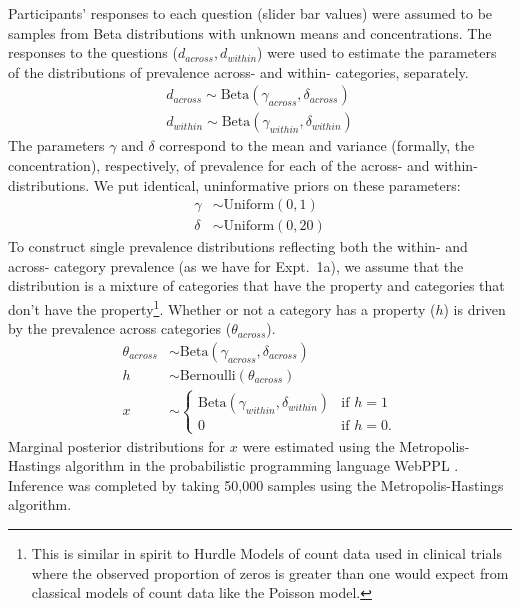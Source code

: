 \documentclass[10pt,letterpaper]{article}
\begin{document}
Participants' responses to each question (slider bar values) were assumed to be samples from Beta distributions with unknown means and concentrations. 
The responses to the questions ($d_{across}, d_{within}$) were used to estimate the parameters of the distributions of prevalence across- and within- categories, separately. 
\begin{align*}
d_{across} \sim \text{Beta}(\gamma_{across}, \delta_{across}) \\
d_{within} \sim \text{Beta}(\gamma_{within}, \delta_{within}) 
\end{align*}
The parameters $\gamma$ and $\delta$ correspond to the mean and variance (formally, the concentration), respectively, of prevalence for each of the across- and within- distributions.
We put identical, uninformative priors on these parameters:
\begin{align*}
\gamma & \sim \text{Uniform}(0,1) \\
\delta & \sim \text{Uniform}(0,20) 
\end{align*}
To construct single prevalence distributions reflecting both the within- and across- category prevalence (as we have for Expt.~1a), we assume that the distribution is a mixture of categories that have the property and categories that don't have the property\footnote{This is similar in spirit to Hurdle Models of count data used in clinical trials where the observed proportion of zeros is greater than one would expect from classical models of count data like the Poisson model.}. Whether or not a category has a property ($h$) is driven by the prevalence across categories ($\theta_{across}$).
%
\begin{align*}
\theta_{across} & \sim \text{Beta}(\gamma_{across}, \delta_{across}) \\ 
h & \sim \text{Bernoulli}(\theta_{across}) \\
x & \sim \begin{cases} 
		\text{Beta}(\gamma_{within}, \delta_{within}) &\mbox{if } h = 1 \\ 
				0 & \mbox{if } h=0. 
				\end{cases} 
\end{align*}
%
Marginal posterior distributions for $x$ were estimated using the Metropolis-Hastings algorithm in the probabilistic programming language WebPPL \cite{dippl}. Inference was completed by taking 50,000 samples using the Metropolis-Hastings algorithm.
\end{document}
